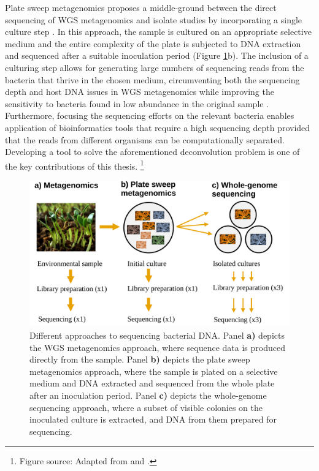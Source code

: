 \documentclass[officiallayout]{tktla}
\let\svthefootnote\thefootnote
\begin{document}
Plate sweep metagenomics proposes a middle-ground between the direct
sequencing of WGS metagenomics and isolate studies by incorporating a
single culture step \citep{maklin_high-resolution_2021}. In this
approach, the sample is cultured on an appropriate selective medium
and the entire complexity of the plate is subjected to DNA extraction
and sequenced after a suitable inoculation period (Figure
\ref{fig:microbiome-sampling-methods}b). The inclusion of a culturing
step allows for generating large numbers of sequencing reads from the
bacteria that thrive in the chosen medium, circumventing both the
sequencing depth and host DNA issues in WGS metagenomics while
improving the sensitivity to bacteria found in low abundance in the
original sample \citep{whelan2020culture,
  tonkin-hill_pneumococcal_2022, zhang2022using}. Furthermore, focusing the sequencing
efforts on the relevant bacteria enables application of bioinformatics
tools that require a high sequencing depth provided that the reads
from different organisms can be computationally separated. Developing
a tool to solve the aforementioned deconvolution problem is one of the
key contributions of this thesis.
\noindent\let\thefootnote\relax\footnote{Figure source: Adapted from \cite{miansari_fenugreek-sprouts} and \cite{niaid_escherichia-coli}.}
\addtocounter{footnote}{-1}\let\thefootnote\svthefootnote
\begin{figure}[!t]
    \centering
    \includegraphics[width=\textwidth,keepaspectratio]{img/sampling/microbiome_sampling_methods.pdf}
    \caption{Different approaches to sequencing bacterial DNA. Panel
      \textbf{a)} depicts the WGS metagenomics approach, where
      sequence data is produced directly from the sample. Panel
      \textbf{b)} depicts the plate sweep metagenomics approach, where
      the sample is plated on a selective medium and DNA extracted and
      sequenced from the whole plate after an inoculation
      period. Panel \textbf{c)} depicts the whole-genome sequencing
      approach, where a subset of visible colonies on the inoculated
      culture is extracted, and DNA from them prepared for
      sequencing.}
    \label{fig:microbiome-sampling-methods}
\end{figure}
\end{document}

